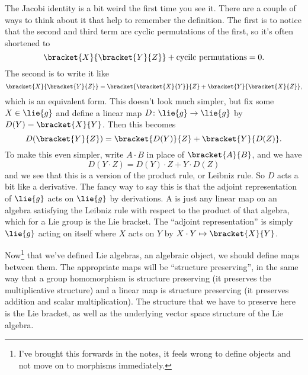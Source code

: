\documentclass[fleqn]{NotesClass}
\begin{document}
    The Jacobi identity is a bit weird the first time you see it.
    There are a couple of ways to think about it that help to remember the definition.
    The first is to notice that the second and third term are cyclic permutations of the first, so it's often shortened to
    \begin{equation}
        \bracket{X}{\bracket{Y}{Z}} + \text{cycilc permutations} = 0.
    \end{equation}
    The second is to write it like
    \begin{equation}
        \bracket{X}{\bracket{Y}{Z}} = \bracket{\bracket{X}{Y}}{Z} + \bracket{Y}{\bracket{X}{Z}},
    \end{equation}
    which is an equivalent form.
    This doesn't look much simpler, but fix some \(X \in \lie{g}\) and define a linear map \(D \colon \lie{g} \to \lie{g}\) by \(D(Y) = \bracket{X}{Y}\).
    Then this becomes
    \begin{equation}
        D(\bracket{Y}{Z}) = \bracket{D(Y)}{Z} + \bracket{Y}{D(Z)}.
    \end{equation}
    To make this even simpler, write \(A \cdot B\) in place of \(\bracket{A}{B}\), and we have
    \begin{equation}
        D(Y \cdot Z) = D(Y) \cdot Z + Y \cdot D(Z)
    \end{equation}
    and we see that this is a version of the product rule, or Leibniz rule.
    So \(D\) acts a bit like a derivative.
    The fancy way to say this is that the adjoint representation of \(\lie{g}\) acts on \(\lie{g}\) by derivations.
    A  is just any linear map on an algebra satisfying the Leibniz rule with respect to the product of that algebra, which for a Lie group is the Lie bracket.
    The \enquote{adjoint representation} is simply \(\lie{g}\) acting on itself where \(X\) acts on \(Y\) by \(X \cdot Y \mapsto \bracket{X}{Y}\). %
    
    Now\footnote{I've brought this forwards in the notes, it feels wrong to define objects and not move on to morphisms immediately.} that we've defined Lie algebras, an algebraic object, we should define maps between them.
    The appropriate maps will be \enquote{structure preserving}, in the same way that a group homomorphism is structure preserving (it preserves the multiplicative structure) and a linear map is structure preserving (it preserves addition and scalar multiplication).
    The structure that we have to preserve here is the Lie bracket, as well as the underlying vector space structure of the Lie algebra.
    
\end{document}
